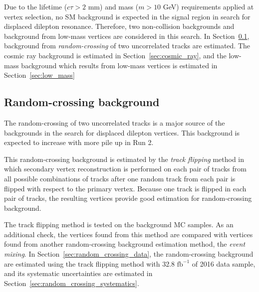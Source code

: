 Due to the lifetime ($c\tau > 2$ mm) and mass ($m > 10$ GeV) requirements applied at vertex selection, no SM background is expected in the signal region in search for displaced dilepton resonance. Therefore, two non-collision backgrounds and background from low-mass vertices are considered in this search. In Section~\ref{sec:random_crossing}, background from \textit{random-crossing} of two uncorrelated tracks are estimated. The cosmic ray background is estimated in Section~\ref{sec:cosmic_ray}, and the low-mass background which results from low-mass vertices is estimated in Section~\ref{sec:low_mass}

\subsection{Random-crossing background}
\label{sec:random_crossing}
The random-crossing of two uncorrelated tracks is a major source of the backgrounds in the search for displaced dilepton vertices. This background is expected to increase with more pile up in Run 2.

This random-crossing background is estimated by the \textit{track flipping} method in which secondary vertex reconstruction is performed on each pair of tracks from all possible combinations of tracks after one random track from each pair is flipped with respect to the primary vertex. Because one track is flipped in each pair of tracks, the resulting vertices provide good estimation for random-crossing background.

The track flipping method is tested on the background MC samples. As an additional check, the vertices found from this method are compared with vertices found from another random-crossing background estimation method, the \textit{event mixing}. In Section~\ref{sec:random_crossing_data}, the random-crossing background are estimated using the track flipping method with 32.8 $\mathrm{fb^{-1}}$ of 2016 data sample, and its systematic uncertainties are estimated in Section~\ref{sec:random_crossing_systematics}.

